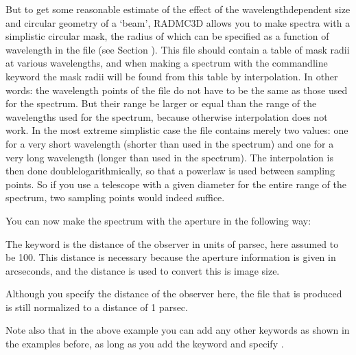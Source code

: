 \documentclass[letterpaper,10pt,english]{sphinxmanual}
\begin{document}
But to get some reasonable estimate of the effect of the wavelength\sphinxhyphen{}dependent
size and circular geometry of a ‘beam’, RADMC\sphinxhyphen{}3D allows you to make spectra with
a simplistic circular mask, the radius of which can be specified as a function
of wavelength in the file  (see Section
{\hyperref[\detokenize{inputoutputfiles:sec-aperture-info-file}]{}}).  This file should contain a table of mask radii
at various wavelengths, and when making a spectrum with the command\sphinxhyphen{}line keyword
 the mask radii will be found from this table by interpolation. In
other words: the wavelength points of the  file do not have
to be the same as those used for the spectrum. But their range  be larger
or equal than the range of the wavelengths used for the spectrum, because
otherwise interpolation does not work. In the most extreme simplistic case the
 file contains merely two values: one for a very short
wavelength (shorter than used in the spectrum) and one for a very long
wavelength (longer than used in the spectrum). The interpolation is then done
double\sphinxhyphen{}logarithmically, so that a powerlaw is used between sampling points. So
if you use a telescope with a given diameter for the entire range of the
spectrum, two sampling points would indeed suffice.

You can now make the spectrum with the aperture in the following way:

\begin{sphinxVerbatim}[commandchars=\\\{\}]
    
\end{sphinxVerbatim}

The keyword  is the distance of the observer in units of
parsec, here assumed to be 100. This distance is necessary
because the aperture information is given in arcseconds, and the distance is
used to convert this is image size.

 Although you specify the distance of the observer
here, the  file that is produced is still normalized
to a distance of 1 parsec.

Note also that in the above example you can add any other keywords as shown
in the examples before, as long as you add the  keyword
and specify .
\end{document}

